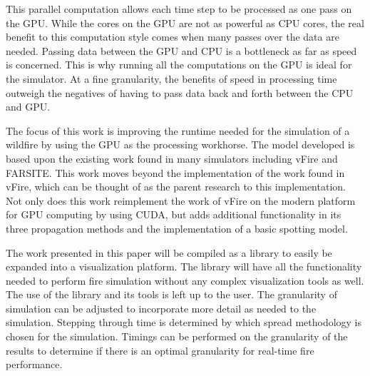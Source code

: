 This parallel computation allows each time step to be processed as one pass on the GPU. While the cores on the GPU are not as powerful as CPU cores, the real benefit to this computation style comes when many passes over the data are needed. Passing data between the GPU and CPU is a bottleneck as far as speed is concerned. This is why running all the computations on the GPU is ideal for the simulator. At a fine granularity, the benefits of speed in processing time outweigh the negatives of having to pass data back and forth between the CPU and GPU.

The focus of this work is improving the runtime needed for the simulation of a wildfire by using the GPU as the processing workhorse. The model developed is based upon the existing work found in many simulators including vFire and FARSITE. This work moves beyond the implementation of the work found in vFire, which can be thought of as the parent research to this implementation. Not only does this work reimplement the work of vFire on the modern platform for GPU computing by using CUDA, but adds additional functionality in its three propagation methods and the implementation of a basic spotting model. 

The work presented in this paper will be compiled as a library to easily be expanded into a visualization platform. The library will have all the functionality needed to perform fire simulation without any complex visualization tools as well. The use of the library and its tools is left up to the user. The granularity of simulation can be adjusted to incorporate more detail as needed to the simulation. Stepping through time is determined by which spread methodology is chosen for the simulation. Timings can be performed on the granularity of the results to determine if there is an optimal granularity for real-time fire performance. 

